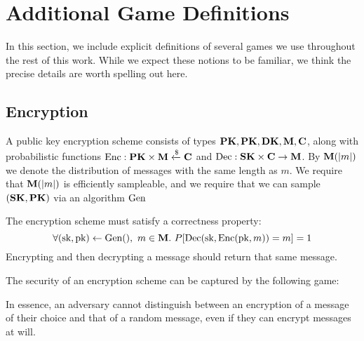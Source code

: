 \section{Additional Game Definitions}

In this section, we include explicit definitions of several games we
use throughout the rest of this work.
While we expect these notions to be familiar, we think the precise
details are worth spelling out here.

\subsection{Encryption}
\label{app:encryption}
A public key encryption scheme consists of types $\textbf{PK}, \textbf{PK}, \textbf{DK}, \textbf{M}, \textbf{C}$,
along with probabilistic functions $\text{Enc} : \textbf{PK} \times \textbf{M} \xleftarrow{\$} \textbf{C}$ and $\text{Dec} : \textbf{SK} \times \textbf{C} \to \textbf{M}$.
By $\textbf{M}(|m|)$ we denote the distribution of messages with the same
length as $m$.
We require that $\textbf{M}(|m|)$ is efficiently sampleable,
and we require that we can sample $(\textbf{SK}, \textbf{PK})$ via an algorithm
$\text{Gen}$

The encryption scheme must satisfy a correctness property:
$$
\forall (\text{sk}, \text{pk}) \gets \text{Gen}(),\ m \in \textbf{M}.\ P[\text{Dec}(\text{sk}, \text{Enc}(\text{pk}, m)) = m] = 1
$$
Encrypting and then decrypting a message should return that same message.

The security of an encryption scheme can be captured by the following game:

In essence, an adversary cannot distinguish between an encryption of a message
of their choice and that of a random message, even if they can encrypt
messages at will.